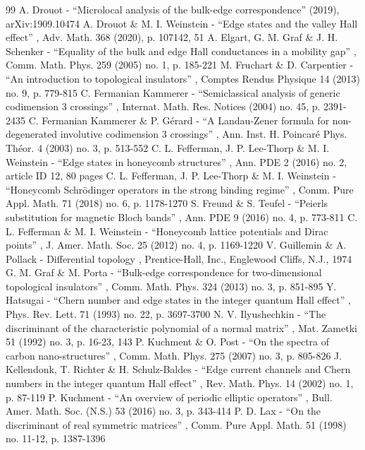 \begin{thebibliography}{99}
 A. Drouot - “Microlocal analysis of the bulk-edge correspondence” (2019), arXiv:1909.10474
 A. Drouot \& M. I. Weinstein - “Edge states and the valley Hall effect” , Adv. Math. 368 (2020), p. 107142, 51
 A. Elgart, G. M. Graf \& J. H. Schenker - “Equality of the bulk and edge Hall conductances in a mobility gap” , Comm. Math. Phys. 259 (2005) no. 1, p. 185-221
 M. Fruchart \& D. Carpentier - “An introduction to topological insulators” , Comptes Rendus Physique 14 (2013) no. 9, p. 779-815
 C. Fermanian Kammerer - “Semiclassical analysis of generic codimension 3 crossings” , Internat. Math. Res. Notices (2004) no. 45, p. 2391-2435
 C. Fermanian Kammerer \& P. Gérard - “A Landau-Zener formula for non-degenerated involutive codimension 3 crossings” , Ann. Inst. H. Poincaré Phys. Théor. 4 (2003) no. 3, p. 513-552
 C. L. Fefferman, J. P. Lee-Thorp \& M. I. Weinstein - “Edge states in honeycomb structures” , Ann. PDE 2 (2016) no. 2, article ID 12, 80 pages
 C. L. Fefferman, J. P. Lee-Thorp \& M. I. Weinstein - “Honeycomb Schrödinger operators in the strong binding regime” , Comm. Pure Appl. Math. 71 (2018) no. 6, p. 1178-1270
 S. Freund \& S. Teufel - “Peierls substitution for magnetic Bloch bands” , Ann. PDE 9 (2016) no. 4, p. 773-811
 C. L. Fefferman \& M. I. Weinstein - “Honeycomb lattice potentials and Dirac points” , J. Amer. Math. Soc. 25 (2012) no. 4, p. 1169-1220
 V. Guillemin \& A. Pollack - Differential topology , Prentice-Hall, Inc., Englewood Cliffs, N.J., 1974
 G. M. Graf \& M. Porta - “Bulk-edge correspondence for two-dimensional topological insulators” , Comm. Math. Phys. 324 (2013) no. 3, p. 851-895
 Y. Hatsugai - “Chern number and edge states in the integer quantum Hall effect” , Phys. Rev. Lett. 71 (1993) no. 22, p. 3697-3700
 N. V. Ilyushechkin - “The discriminant of the characteristic polynomial of a normal matrix” , Mat. Zametki 51 (1992) no. 3, p. 16-23, 143
 P. Kuchment \& O. Post - “On the spectra of carbon nano-structures” , Comm. Math. Phys. 275 (2007) no. 3, p. 805-826
 J. Kellendonk, T. Richter \& H. Schulz-Baldes - “Edge current channels and Chern numbers in the integer quantum Hall effect” , Rev. Math. Phys. 14 (2002) no. 1, p. 87-119
 P. Kuchment - “An overview of periodic elliptic operators” , Bull. Amer. Math. Soc. (N.S.) 53 (2016) no. 3, p. 343-414
 P. D. Lax - “On the discriminant of real symmetric matrices” , Comm. Pure Appl. Math. 51 (1998) no. 11-12, p. 1387-1396

\end{thebibliography}
